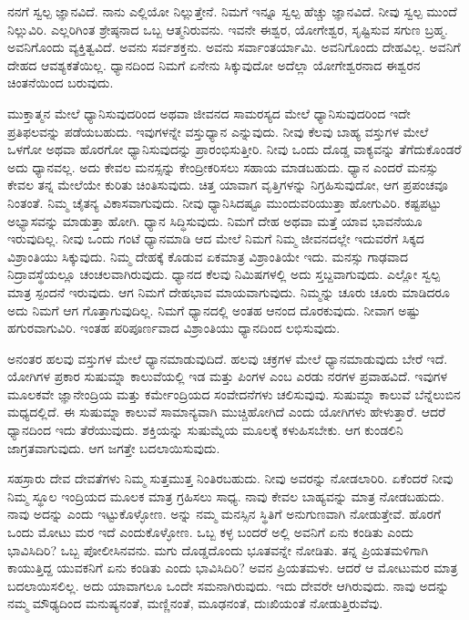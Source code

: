 ನನಗೆ ಸ್ವಲ್ಪ ಜ್ಞಾನವಿದೆ. ನಾನು ಎಲ್ಲಿಯೋ ನಿಲ್ಲುತ್ತೇನೆ. ನಿಮಗೆ ಇನ್ನೂ ಸ್ವಲ್ಪ ಹೆಚ್ಚು ಜ್ಞಾನವಿದೆ. ನೀವು ಸ್ವಲ್ಪ ಮುಂದೆ ನಿಲ್ಲುವಿರಿ. ಎಲ್ಲರಿಗಿಂತ ಶ್ರೇಷ್ಠನಾದ ಒಬ್ಬ ಆತ್ಮನಿರುವನು. ಇವನೇ ಈಶ್ವರ, ಯೋಗೇಶ್ವರ, ಸೃಷ್ಟಿಸುವ ಸಗುಣ ಬ್ರಹ್ಮ. ಅವನಿಗೊಂದು ವ್ಯಕ್ತಿತ್ವವಿದೆ. ಅವನು ಸರ್ವಶಕ್ತನು. ಅವನು ಸರ್ವಾಂತರ್ಯಾಮಿ. ಅವನಿಗೊಂದು ದೇಹವಿಲ್ಲ. ಅವನಿಗೆ ದೇಹದ ಆವಶ್ಯಕತೆಯಿಲ್ಲ. ಧ್ಯಾನದಿಂದ ನಿಮಗೆ ಏನೇನು ಸಿಕ್ಕುವುದೋ ಅದೆಲ್ಲಾ ಯೋಗೇಶ್ವರನಾದ ಈಶ್ವರನ ಚಿಂತನೆಯಿಂದ ಬರುವುದು.

ಮುಕ್ತಾತ್ಮನ ಮೇಲೆ ಧ್ಯಾನಿಸುವುದರಿಂದ ಅಥವಾ ಜೀವನದ ಸಾಮರಸ್ಯದ ಮೇಲೆ ಧ್ಯಾನಿಸುವುದರಿಂದ ಇದೇ ಪ್ರತಿಫಲವನ್ನು ಪಡೆಯಬಹುದು. ಇವುಗಳನ್ನೇ ವಸ್ತುಧ್ಯಾನ ಎನ್ನುವುದು. ನೀವು ಕೆಲವು ಬಾಹ್ಯ ವಸ್ತುಗಳ ಮೇಲೆ ಒಳಗೋ ಅಥವಾ ಹೊರಗೋ ಧ್ಯಾನಿಸುವುದನ್ನು ಪ್ರಾರಂಭಿಸುತ್ತೀರಿ. ನೀವು ಒಂದು ದೊಡ್ಡ ವಾಕ್ಯವನ್ನು ತೆಗೆದುಕೊಂಡರೆ ಅದು ಧ್ಯಾನವಲ್ಲ. ಅದು ಕೇವಲ ಮನಸ್ಸನ್ನು ಕೇಂದ್ರೀಕರಿಸಲು ಸಹಾಯ ಮಾಡಬಹುದು. ಧ್ಯಾನ ಎಂದರೆ ಮನಸ್ಸು ಕೇವಲ ತನ್ನ ಮೇಲೆಯೇ ಕುರಿತು ಚಿಂತಿಸುವುದು. ಚಿತ್ತ ಯಾವಾಗ ವೃತ್ತಿಗಳನ್ನು ನಿಗ್ರಹಿಸುವುದೋ, ಆಗ ಪ್ರಪಂಚವೂ ನಿಂತಂತೆ. ನಿಮ್ಮ ಚೈತನ್ಯ ವಿಕಾಸವಾಗುವುದು. ನೀವು ಧ್ಯಾನಿಸಿದಷ್ಟೂ ಮುಂದುವರಿಯುತ್ತಾ ಹೋಗುವಿರಿ. ಕಷ್ಟಪಟ್ಟು ಅಭ್ಯಾಸವನ್ನು ಮಾಡುತ್ತಾ ಹೋಗಿ. ಧ್ಯಾನ ಸಿದ್ಧಿಸುವುದು. ನಿಮಗೆ ದೇಹ ಅಥವಾ ಮತ್ತೆ ಯಾವ ಭಾವನೆಯೂ ಇರುವುದಿಲ್ಲ. ನೀವು ಒಂದು ಗಂಟೆ ಧ್ಯಾನಮಾಡಿ ಆದ ಮೇಲೆ ನಿಮಗೆ ನಿಮ್ಮ ಜೀವನದಲ್ಲೇ ಇದುವರೆಗೆ ಸಿಕ್ಕದ ವಿಶ್ರಾಂತಿಯು ಸಿಕ್ಕುವುದು. ನಿಮ್ಮ ದೇಹಕ್ಕೆ ಕೊಡುವ ಏಕಮಾತ್ರ ವಿಶ್ರಾಂತಿಯೇ ಇದು. ಮನಸ್ಸು ಗಾಢವಾದ ನಿದ್ರಾವಸ್ಥೆಯಲ್ಲೂ ಚಂಚಲವಾಗಿರುವುದು. ಧ್ಯಾನದ ಕೆಲವು ನಿಮಿಷಗಳಲ್ಲಿ ಅದು ಸ್ತಬ್ದವಾಗುವುದು. ಎಲ್ಲೋ ಸ್ವಲ್ಪ ಮಾತ್ರ ಸ್ಪಂದನೆ ಇರುವುದು. ಆಗ ನಿಮಗೆ ದೇಹಭಾವ ಮಾಯವಾಗುವುದು. ನಿಮ್ಮನ್ನು ಚೂರು ಚೂರು ಮಾಡಿದರೂ ಅದು ನಿಮಗೆ ಆಗ ಗೊತ್ತಾಗುವುದಿಲ್ಲ. ನಿಮಗೆ ಧ್ಯಾನದಲ್ಲಿ ಅಂತಹ ಆನಂದ ದೊರಕುವುದು. ನೀವಾಗ ಅಷ್ಟು ಹಗುರವಾಗುವಿರಿ. ಇಂತಹ ಪರಿಪೂರ್ಣವಾದ ವಿಶ್ರಾಂತಿಯು ಧ್ಯಾನದಿಂದ ಲಭಿಸುವುದು.

ಅನಂತರ ಹಲವು ವಸ್ತುಗಳ ಮೇಲೆ ಧ್ಯಾನಮಾಡುವುದಿದೆ. ಹಲವು ಚಕ್ರಗಳ ಮೇಲೆ ಧ್ಯಾನಮಾಡುವುದು ಬೇರೆ ಇದೆ. ಯೋಗಿಗಳ ಪ್ರಕಾರ ಸುಷುಮ್ನಾ ಕಾಲುವೆಯಲ್ಲಿ ಇಡ ಮತ್ತು ಪಿಂಗಳ ಎಂಬ ಎರಡು ನರಗಳ ಪ್ರವಾಹವಿದೆ. ಇವುಗಳ ಮೂಲಕವೇ ಜ್ಞಾನೇಂದ್ರಿಯ ಮತ್ತು ಕರ್ಮೇಂದ್ರಿಯದ ಸಂವೇದನೆಗಳು ಚಲಿಸುವುವು. ಸುಷುಮ್ನಾ ಕಾಲುವೆ ಬೆನ್ನೆಲುಬಿನ ಮಧ್ಯದಲ್ಲಿದೆ. ಈ ಸುಷುಮ್ನಾ ಕಾಲುವೆ ಸಾಮಾನ್ಯವಾಗಿ ಮುಚ್ಚಿಹೋಗಿದೆ ಎಂದು ಯೋಗಿಗಳು ಹೇಳುತ್ತಾರೆ. ಆದರೆ ಧ್ಯಾನದಿಂದ ಇದು ತೆರೆಯುವುದು. ಶಕ್ತಿಯನ್ನು ಸುಷುಮ್ನೆಯ ಮೂಲಕ್ಕೆ ಕಳುಹಿಸಬೇಕು. ಆಗ ಕುಂಡಲಿನಿ ಜಾಗ್ರತವಾಗುವುದು. ಆಗ ಜಗತ್ತೇ ಬದಲಾಯಿಸುವುದು.

ಸಹಸ್ರಾರು ದೇವ ದೇವತೆಗಳು ನಿಮ್ಮ ಸುತ್ತಮುತ್ತ ನಿಂತಿರಬಹುದು. ನೀವು ಅವರನ್ನು ನೋಡಲಾರಿರಿ. ಏಕೆಂದರೆ ನೀವು ನಿಮ್ಮ ಸ್ಥೂಲ ಇಂದ್ರಿಯದ ಮೂಲಕ ಮಾತ್ರ ಗ್ರಹಿಸಲು ಸಾಧ್ಯ. ನಾವು ಕೇವಲ ಬಾಹ್ಯವನ್ನು ಮಾತ್ರ ನೋಡಬಹುದು. ನಾವು ಅದನ್ನು  ಎಂದು ಇಟ್ಟುಕೊಳ್ಳೋಣ.  ಅನ್ನು ನಮ್ಮ ಮನಸ್ಸಿನ ಸ್ಥಿತಿಗೆ ಅನುಗುಣವಾಗಿ ನೋಡುತ್ತೇವೆ. ಹೊರಗೆ ಒಂದು ಮೋಟು ಮರ ಇದೆ ಎಂದುಕೊಳ್ಳೋಣ. ಒಬ್ಬ ಕಳ್ಳ ಬಂದರೆ ಅಲ್ಲಿ ಅವನಿಗೆ ಏನು ಕಂಡಿತು ಎಂದು ಭಾವಿಸಿದಿರಿ? ಒಬ್ಬ ಪೋಲೀಸಿನವನು. ಮಗು ದೊಡ್ಡದೊಂದು ಭೂತವನ್ನೇ ನೋಡಿತು. ತನ್ನ ಪ್ರಿಯತಮಳಿಗಾಗಿ ಕಾಯುತ್ತಿದ್ದ ಯುವಕನಿಗೆ ಏನು ಕಂಡಿತು ಎಂದು ಭಾವಿಸಿದಿರಿ? ಅವನ ಪ್ರಿಯತಮಳು. ಆದರೆ ಆ ಮೋಟುಮರ ಮಾತ್ರ ಬದಲಾಯಿಸಲಿಲ್ಲ. ಅದು ಯಾವಾಗಲೂ ಒಂದೇ ಸಮನಾಗಿರುವುದು. ಇದು ದೇವರೇ ಆಗಿರುವುದು. ನಾವು ಅದನ್ನು ನಮ್ಮ ಮೌಢ್ಯದಿಂದ ಮನುಷ್ಯನಂತೆ, ಮಣ್ಣಿನಂತೆ, ಮೂಢನಂತೆ, ದುಃಖಿಯಂತೆ ನೋಡುತ್ತಿರುವೆವು.


